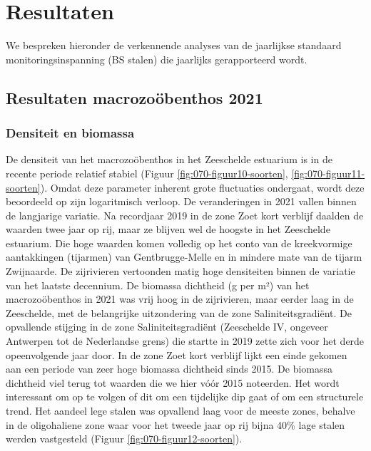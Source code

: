 \documentclass[twoside]{extreport}
\begin{document}
\hypertarget{resultaten}{%
\section{Resultaten}\label{resultaten}}

We bespreken hieronder de verkennende analyses van de jaarlijkse
standaard monitoringsinspanning (BS stalen) die jaarlijks gerapporteerd
wordt.

\hypertarget{resultaten-macrozouxf6benthos-2021}{%
\subsection{Resultaten macrozoöbenthos
2021}\label{resultaten-macrozouxf6benthos-2021}}

\hypertarget{densiteit-en-biomassa}{%
\subsubsection{Densiteit en biomassa}\label{densiteit-en-biomassa}}

De densiteit van het macrozoöbenthos in het Zeeschelde estuarium is in
de recente periode relatief stabiel (Figuur
\ref{fig:070-figuur10-soorten}, \ref{fig:070-figuur11-soorten}). Omdat
deze parameter inherent grote fluctuaties ondergaat, wordt deze
beoordeeld op zijn logaritmisch verloop. De veranderingen in 2021 vallen
binnen de langjarige variatie. Na recordjaar 2019 in de zone Zoet kort
verblijf daalden de waarden twee jaar op rij, maar ze blijven wel de
hoogste in het Zeeschelde estuarium. Die hoge waarden komen volledig op
het conto van de kreekvormige aantakkingen (tijarmen) van
Gentbrugge-Melle en in mindere mate van de tijarm Zwijnaarde. De
zijrivieren vertoonden matig hoge densiteiten binnen de variatie van het
laatste decennium. De biomassa dichtheid (g per m²) van het
macrozoöbenthos in 2021 was vrij hoog in de zijrivieren, maar eerder
laag in de Zeeschelde, met de belangrijke uitzondering van de zone
Saliniteitsgradiënt. De opvallende stijging in de zone
Saliniteitsgradiënt (Zeeschelde IV, ongeveer Antwerpen tot de
Nederlandse grens) die startte in 2019 zette zich voor het derde
opeenvolgende jaar door. In de zone Zoet kort verblijf lijkt een einde
gekomen aan een periode van zeer hoge biomassa dichtheid sinds 2015. De
biomassa dichtheid viel terug tot waarden die we hier vóór 2015
noteerden. Het wordt interessant om op te volgen of dit om een
tijdelijke dip gaat of om een structurele trend. Het aandeel lege stalen
was opvallend laag voor de meeste zones, behalve in de oligohaliene zone
waar voor het tweede jaar op rij bijna 40\% lage stalen werden
vastgesteld (Figuur \ref{fig:070-figuur12-soorten}).
\end{document}
